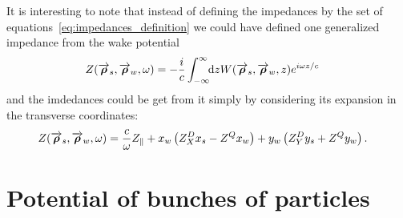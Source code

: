     It is interesting to note that instead of defining the impedances by the set of equations~\eqref{eq:impedances_definition} we could have defined one generalized impedance from the wake potential
    \begin{align}\label{eq:generalized_impedance_definition}
            Z(\overrightarrow{\boldsymbol{\rho}}_s, \overrightarrow{\boldsymbol{\rho}}_w, \omega) &= -\frac{i}{c} \int_{-\infty}^{\infty}\!\!\text{d}z W(\overrightarrow{\boldsymbol{\rho}}_s, \overrightarrow{\boldsymbol{\rho}}_w, z)e^{i\omega z/c}
    \end{align}
    and the imdedances could be get from it simply by considering its expansion in the transverse coordinates:
    \begin{align}
        Z(\overrightarrow{\boldsymbol{\rho}}_s, \overrightarrow{\boldsymbol{\rho}}_w, \omega) &=
	  		\frac{c}{\omega}Z_\parallel +
			x_w\left(Z^D_Xx_s - Z^Qx_w\right) +
			y_w\left(Z^D_Yy_s + Z^Qy_w\right).
    \end{align}

\section{Potential of bunches of particles}\label{sec:potential_of_bunch}

